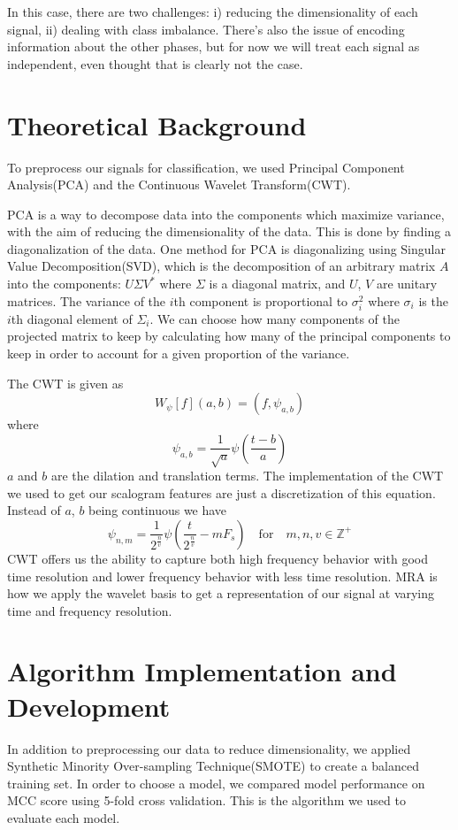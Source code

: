 \documentclass{article}
\begin{document}
In this case, there are two challenges: i) reducing the dimensionality of each
signal, ii) dealing with class imbalance. There's also the issue of encoding
information about the other phases, but for now we will treat each signal as
independent, even thought that is clearly not the case.

\section{Theoretical Background}
To preprocess our signals for classification, we used Principal Component
Analysis(PCA) and the Continuous Wavelet Transform(CWT).

PCA is a way to decompose data into the components which maximize variance, with
the aim of reducing the dimensionality of the data. This is done by finding a
diagonalization of the data. One method for PCA is diagonalizing using Singular
Value Decomposition(SVD), which is the decomposition of an arbitrary matrix $A$
into the components: $U \Sigma V^*$ where $\Sigma$ is a diagonal matrix, and
$U$, $V$ are unitary matrices. The variance of the $i$th component is
proportional to $\sigma_i^2$ where $\sigma_i$ is the $i$th diagonal element of
$\Sigma_i$. We can choose how many components of the projected matrix to keep by
calculating how many of the principal components to keep in order to account for
a given proportion of the variance.

The CWT is given as
$$
W_\psi[f](a, b) = (f, \psi_{a, b})
$$
where
$$
\psi_{a, b} = \frac{1}{\sqrt{a}}\psi(\frac{t - b}{a})
$$
$a$ and $b$ are the dilation and translation terms. The implementation of the
CWT we used to get our scalogram features are just a discretization of this
equation. Instead of $a$, $b$ being continuous we have
$$
\psi_{n, m} = \frac{1}{2^\frac{n}{v}}\psi(\frac{t}{2^\frac{n}{v}} - m F_s) \quad \mathrm{for}\quad m, n, v \in \mathbb{Z^+}
$$
CWT offers us the ability to capture both high frequency behavior with good time
resolution and lower frequency behavior with less time resolution. MRA is how we
apply the wavelet basis to get a representation of our signal at varying time
and frequency resolution.


\section{Algorithm Implementation and Development}
In addition to preprocessing our data to reduce dimensionality, we applied
Synthetic Minority Over-sampling Technique(SMOTE) to create a balanced training
set. In order to choose a model, we compared model performance on MCC score
using 5-fold cross validation. This is the algorithm we used to evaluate each model.
\end{document}
